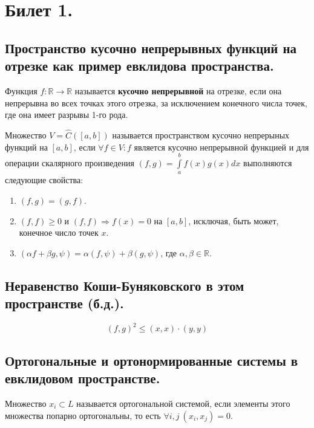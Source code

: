 \section{Билет 1.}

\subsection{Пространство кусочно непрерывных функций на отрезке как пример евклидова пространства.}
\begin{definition}
    Функция $f : \mathbb{R} \to \mathbb{R}$ называется \textbf{кусочно непрерывной} на отрезке, если она непрерывна во всех точках этого отрезка, за исключением конечного числа точек, где она имеет разрывы 1-го рода.
\end{definition}
\begin{definition}
    Множество $V = \hat{C}([a,b])$ называется пространством кусочно непрерыных функций на $[a,b]$, если $\forall f \in V : f$ является кусочно непрерывной функцией и для операции скалярного произведения
    $(f, g) = \int \limits_a^b f(x) g(x) dx$ выполняются следующие свойства:
    \begin{enumerate}
        \item $(f, g) = (g, f)$.
        \item $(f, f) \geqslant 0$ и $(f, f) \Rightarrow f(x) = 0$ на $[a,b]$, исключая, быть может, конечное число точек $x$.
        \item $(\alpha f + \beta g, \psi) = \alpha (f, \psi) + \beta (g, \psi)$, где $\alpha, \beta \in \mathbb{R}$.
    \end{enumerate}
\end{definition}

\subsection{Неравенство Коши-Буняковского в этом пространстве (б.д.).}
\[
    (f,g)^2 \leqslant (x,x) \cdot (y,y)
\]

\subsection{Ортогональные и ортонормированные системы в евклидовом пространстве.}
\begin{definition}
    Множество ${x_i} \subset L$ называется ортогональной системой, если элементы этого множества попарно ортогональны, то есть $\forall i, j \> (x_i, x_j) = 0$.
\end{definition}

